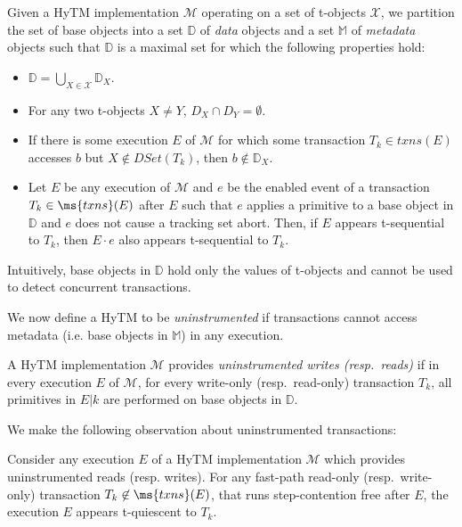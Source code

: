 Given a HyTM implementation $\mathcal{M}$ operating on a set of t-objects $\mathcal{X}$, 
we partition the set of base objects into a set $\mathbb{D}$ of \emph{data} objects and 
a set $\mathbb{M}$ of \emph{metadata} objects such that $\mathbb{D}$ is a maximal set for which the following properties hold:
%
\begin{itemize}
\item $\mathbb{D} = \bigcup\limits_{X\in\mathcal{X}} \mathbb{D}_X$.
\item For any two t-objects $X\neq Y$, $D_X \cap D_Y = \emptyset$.
\item If there is some execution $E$ of $\mathcal{M}$ for which some transaction $T_k \in txns(E)$ accesses $b$ 
but $X \not\in DSet(T_k)$, then $b\not\in \mathbb{D}_X$. 
\item 
Let $E$ be any execution of $\mathcal{M}$ and 
$e$ be the enabled event of a transaction $T_k \in \ms{txns}(E)$ after $E$ such that $e$ 
applies a primitive to a base object in $\mathbb{D}$ and $e$ does not cause a tracking set abort.
Then, if $E$ appears t-sequential to $T_k$, then $E\cdot e$ also appears t-sequential to $T_k$.
%
\end{itemize}
%
Intuitively, base objects in $\mathbb{D}$ hold only the values of t-objects and cannot be used to detect concurrent transactions. 

We now define a HyTM to be \emph{uninstrumented} if transactions cannot access metadata 
(i.e. base objects in $\mathbb{M}$) in any execution. 
%
%
\begin{definition}
\label{def:ins}
A HyTM implementation $\mathcal{M}$ provides \emph{uninstrumented writes (resp.\ reads)} 
if in every execution $E$ of $\mathcal{M}$, for every write-only (resp.\ read-only) transaction $T_k$, 
all primitives in $E|k$ are performed on base objects in $\mathbb{D}$.
\end{definition}
% 
We make the following observation about uninstrumented transactions:
%
\begin{observation}
\label{ob:ins}
Consider any execution $E$ of a HyTM implementation $\mathcal{M}$ which provides uninstrumented reads (resp. writes). 
For any fast-path read-only (resp.\ write-only) transaction $T_k \not\in \ms{txns}(E)$, 
that runs step-contention free after $E$, 
the execution $E$ appears t-quiescent to $T_k$.
\end{observation}
